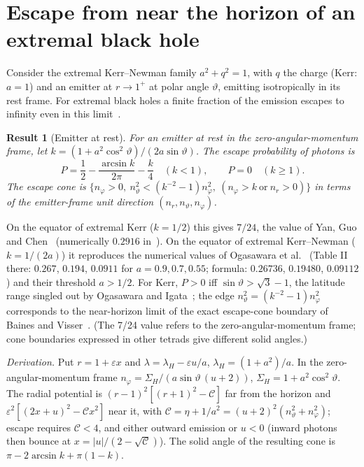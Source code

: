 \documentclass[11pt,a4paper]{article}
\newtheorem{result}{Result}
\theoremstyle{remark}
\numberwithin{equation}{section}
\begin{document}
\section{Escape from near the horizon of an extremal black hole}\label{sec:escape}
Consider the extremal Kerr--Newman family $a^2+q^2=1$, with $q$ the charge (Kerr: $a=1$) and an emitter at $r\to1^+$ at polar angle
$\vartheta$, emitting isotropically in its rest frame. For extremal black holes a finite fraction of the
emission escapes to infinity even in this limit~\cite{Ogasawara2020,YanGuoChen2021,GatesHadarLupsasca2021}.

\begin{result}[Emitter at rest]\label{res:zamo}
For an emitter at rest in the zero-angular-momentum frame, let
$k=(1+a^2\cos^2\vartheta)/(2a\sin\vartheta)$. The escape probability of photons is
\begin{equation}
P=\frac12-\frac{\arcsin k}{2\pi}-\frac k4\quad(k<1),\qquad P=0\quad(k\ge1).
\label{eq:Pzamo}
\end{equation}
The escape cone is $\{n_\varphi>0,\ n_\vartheta^2<(k^{-2}-1)n_\varphi^2,\ (n_\varphi>k\ \text{or}\ n_r>0)\}$ in terms of the
emitter-frame unit direction $(n_r,n_\vartheta,n_\varphi)$.
\end{result}
On the equator of extremal Kerr ($k=1/2$) this gives $7/24$, the value of Yan, Guo and Chen~\cite{YanGuoChen2021}
(numerically $0.2916$ in~\cite{Ogasawara2020}). On the equator of extremal Kerr--Newman ($k=1/(2a)$) it reproduces the
numerical values of Ogasawara et al.~\cite{Ogasawara2020} (Table II there: $0.267$, $0.194$, $0.0911$ for
$a=0.9,0.7,0.55$; formula: $0.26736$, $0.19480$, $0.09112$) and their threshold $a>1/2$. For Kerr, $P>0$ iff
$\sin\vartheta>\sqrt3-1$, the latitude range singled out by Ogasawara and Igata~\cite{OgasawaraIgata2021}; the edge
$n_\vartheta^2=(k^{-2}-1)n_\varphi^2$ corresponds to the near-horizon limit of the exact escape-cone boundary of Baines and
Visser~\cite{BainesVisser2025}. (The 7/24 value refers to the zero-angular-momentum frame; cone boundaries
expressed in other tetrads give different solid angles.)

\emph{Derivation.} Put $r=1+\varepsilon x$ and $\lambda=\lambda_H-\varepsilon u/a$, $\lambda_H=(1+a^2)/a$. In the
zero-angular-momentum frame $n_\varphi=\Sigma_H/(a\sin\vartheta\,(u+2))$, $\Sigma_H=1+a^2\cos^2\vartheta$. The radial
potential is $(r-1)^2[(r+1)^2-\mathcal C]$ far from the horizon and $\varepsilon^2[(2x+u)^2-\mathcal Cx^2]$ near it,
with $\mathcal C=\eta+1/a^2=(u+2)^2(n_\vartheta^2+n_\varphi^2)$; escape requires $\mathcal C<4$, and either outward
emission or $u<0$ (inward photons then bounce at $x=|u|/(2-\sqrt{\mathcal C})$). The solid angle of the resulting cone
is $\pi-2\arcsin k+\pi(1-k)$.
\end{document}
